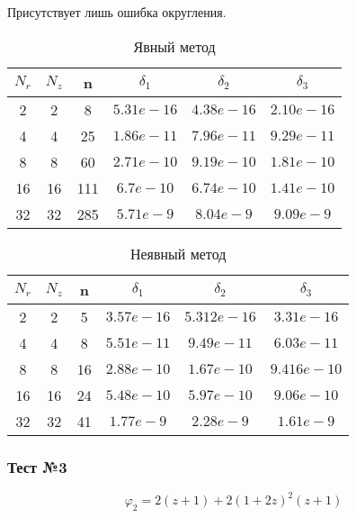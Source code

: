 Присутствует лишь ошибка округления.

\begin{table}[H]
  \begin{center}
    \begin{tabular}{*{6}c}
      \toprule
      $ N_r $ & $ N_z $ & n & $ \delta_1 $ & $ \delta_2 $ & $ \delta_3 $ \\
      \midrule
      2 & 2 & 8 & $5.31e-16 $ & $4.38e-16 $ & $2.10e-16 $ \\
      4 & 4 & 25 & $1.86e-11 $ & $7.96e-11 $ & $9.29e-11 $ \\
      8 & 8 & 60 & $2.71e-10 $ & $9.19e-10 $ & $1.81e-10 $ \\
      16 & 16 & 111 & $6.7e-10 $ & $6.74e-10 $ & $1.41e-10 $ \\
      32 & 32 & 285 & $5.71e-9 $ & $8.04e-9 $ & $9.09e-9 $ \\
      \bottomrule
    \end{tabular}
    \caption{Явный метод}
  \end{center}
  \end{table}
  
  \begin{table}[H]
    \begin{center}
      \begin{tabular}{*{6}c}
        \toprule
        $ N_r $ & $ N_z $ & n & $ \delta_1 $ & $ \delta_2 $ & $ \delta_3 $ \\
        \midrule
        2 & 2 & 5 & $3.57e-16 $ & $5.312e-16 $ & $3.31e-16 $  \\
        4 & 4 & 8 & $5.51e-11 $ & $9.49e-11 $ & $6.03e-11 $ \\
        8 & 8 & 16 & $2.88e-10 $ & $1.67e-10 $ & $9.416e-10 $ \\
        16 & 16 & 24 & $5.48e-10 $ & $5.97e-10 $ & $9.06e-10 $ \\
        32 & 32 & 41 & $1.77e-9 $ & $2.28e-9 $ & $1.61e-9 $ \\
        \bottomrule
      \end{tabular}
      \caption{Неявный метод}
    \end{center}
  \end{table}

\subsubsection*{Тест №3}

\[
 \varphi_2 = 2(z + 1) + 2(1 + 2z)^2(z + 1)
\]

